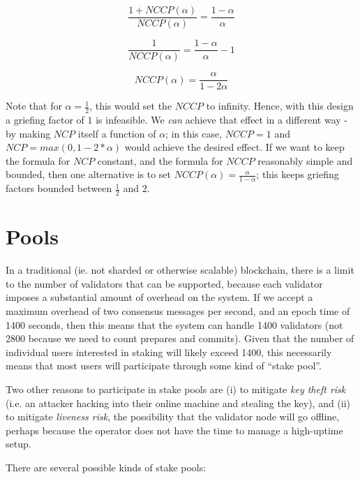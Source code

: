 \documentclass[12pt]{article}
\begin{document}
$$\frac{1 + NCCP(\alpha)}{NCCP(\alpha)} = \frac{1-\alpha}{\alpha}$$

$$\frac{1}{NCCP(\alpha)} = \frac{1-\alpha}{\alpha} - 1$$

$$NCCP(\alpha) = \frac{\alpha}{1-2\alpha}$$

Note that for $\alpha = \frac{1}{2}$, this would set the $NCCP$ to infinity. Hence, with this design a griefing factor of $1$ is infeasible. We \textit{can} achieve that effect in a different way - by making $NCP$ itself a function of $\alpha$; in this case, $NCCP = 1$ and $NCP = max(0, 1 - 2 * \alpha)$ would achieve the desired effect. If we want to keep the formula for $NCP$ constant, and the formula for $NCCP$ reasonably simple and bounded, then one alternative is to set $NCCP(\alpha) = \frac{\alpha}{1-\alpha}$; this keeps griefing factors bounded between $\frac{1}{2}$ and $2$.

\section{Pools}

In a traditional (ie. not sharded or otherwise scalable) blockchain, there is a limit to the number of validators that can be supported, because each validator imposes a substantial amount of overhead on the system. If we accept a maximum overhead of two consensus messages per second, and an epoch time of 1400 seconds, then this means that the system can handle 1400 validators (not 2800 because we need to count prepares and commits). Given that the number of individual users interested in staking will likely exceed 1400, this necessarily means that most users will participate through some kind of ``stake pool''.

Two other reasons to participate in stake pools are (i) to mitigate \textit{key theft risk} (i.e. an attacker hacking into their online machine and stealing the key), and (ii) to mitigate \textit{liveness risk}, the possibility that the validator node will go offline, perhaps because the operator does not have the time to manage a high-uptime setup.

There are several possible kinds of stake pools:
\end{document}
